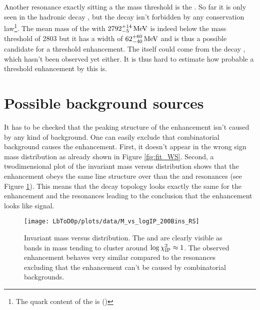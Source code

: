 Another resonance exactly sitting a the \Dz\proton mass threshold is the .
So far it is only seen in the hadronic decay , but the decay  isn't forbidden by any conservation law\footnote{The quark content of the  is (\uquark\dquark\cquark)}.
The mean mass of the  with $2792^{+14}_{-5}\mathrm{\,Me\kern -0.1em V}$ is indeed below the \Dz\proton mass threshold of 2803 \mev but it has a width of $62^{+60}_{-40}\mathrm{\,Me\kern -0.1em V}$ \cite{PDG} and is thus a possible candidate for a threshold enhancement.
The  itself could come from the decay , which hasn't been observed yet either.
It is thus hard to estimate how probable a threshold enhancement by this  is.

\section{Possible background sources}
It has to be checked that the peaking structure of the enhancement isn't caused by any kind of background.
One can easily exclude that combinatorial background causes the enhancement.
First, it doesn't appear in the wrong sign \Dz\proton mass distribution as already shown in Figure \ref{fig:fit_WS}.
Second, a twodimensional plot of the invariant \Dz\proton mass versus \logIP distribution shows that the enhancement obeys the same line structure over \logIP than the \LcResI and \LcResII resonances (see Figure \ref{fig:plot_M_vs_logIP}).
This means that the decay topology looks exactly the same for the enhancement and the resonances leading to the conclusion that the enhancement looks like signal.
\begin{figure}[hptb]
	\centering
	\texttt{[image: LbToD0p/plots/data/M\_vs\_logIP\_200Bins\_RS]}
	\caption{Invariant \Dz\proton mass versus \logIP distribution. The \LcResI and \LcResII are clearly visible as bands in \Dz\proton mass tending to cluster around $\log \chi^2_{\text{IP}} \approx 1$. The observed enhancement behaves very similar compared to the resonances excluding that the enhancement can't be caused by combinatorial backgrounds.}
	\label{fig:plot_M_vs_logIP}
\end{figure}

